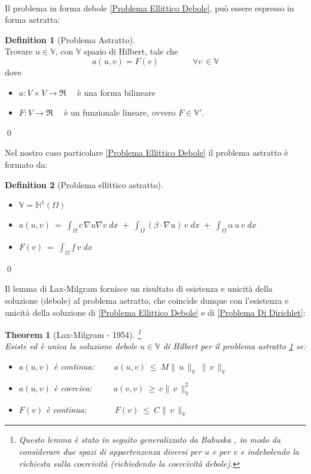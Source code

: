 \documentclass[12pt,a4paper]{report}
\theoremstyle{theorem}
\newtheorem{theorem}{Theorem}[section]
\theoremstyle{theorem}
\theoremstyle{definition}
\newtheorem{definition}{Definition}[section]
\providecommand{\norm}[1]{\lVert \, #1 \, \rVert}
\begin{document}
\hfill \\
Il problema in forma debole \ref{Problema Ellittico Debole}, può essere espresso in forma astratta:
\begin{definition} [Problema Astratto]  \label{Problema Astratto}
\hfill \\
Trovare $u \in  \mathbb{V}$, con $\mathbb{V}$ spazio di Hilbert, tale che
\[ a(u,v) = F(v) \qquad \qquad \forall v \, \in \mathbb{V} \]
dove
\begin{itemize}
	\item $a: V \times V \rightarrow \Re \quad $ è una forma bilineare 
	\item $F: V \rightarrow \Re \quad $ è un funzionale lineare, ovvero $F \in \mathbb{V}'$.
\end{itemize}
\qed
\end{definition}
Nel nostro caso particolare \ref{Problema Ellittico Debole}  il problema astratto è formato da:
\begin{definition} [Problema ellittico astratto]  \label{Problema Ellittico Astratto}
\hfill \\
\begin{itemize}
	\item $\mathbb{V} = \mathbb{H}^1(\Omega)$
	\item $a(u,v) \ = \ \int_{\Omega}{c \, \nabla u \nabla v \; dx} \; + \; \int_{\Omega}{(\beta \cdot \nabla u) \, v \; dx} \; + \; \int_{\Omega}{\alpha \, u \, v \; dx}$
	\item $F(v) \ = \ \int_{\Omega}{f \, v \; dx}$
\end{itemize}
\qed
\end{definition}
Il lemma di Lax-Milgram fornisce un risultato di esistenza e unicità della soluzione (debole) al problema astratto, che coincide dunque con l'esistenza e unicità della soluzione di \ref{Problema Ellittico Debole} e di \ref{Problema Di Dirichlet}:
\begin{theorem} [Lax-Milgram - 1954]  \label{Lemma di Lax-Milgram} \footnote{Questo lemma è stato in seguito generalizzato da Babuska \cite{babuska1971BLM}, in modo da considerare due spazi di appartenzenza diversi per $u$ e per $v$ e indebolendo la richiesta sulla coercività (richiedendo la coercività debole).}
\hfill \\
Esiste ed è unica la soluzione debole $u \in \mathbb{V}$ di Hilbert per il problema astratto \ref{Problema Astratto} se:
\begin{itemize}
	\item $a(u,v)$ è continua: $\qquad a(u,v) \ \leq \ M \norm{u}_{\mathbb{V}} \, \norm{v}_{\mathbb{V}}$
	\item $a(u,v)$ è coerciva: $\qquad \ a(v,v) \ \geq \ c \norm{v}_{\mathbb{V}}^{2}$
	\item $F(v)$ è continua: $\qquad \quad F(v) \ \leq \ C \norm{v}_{\mathbb{V}}$
\end{itemize}
\end{theorem}
\end{document}
